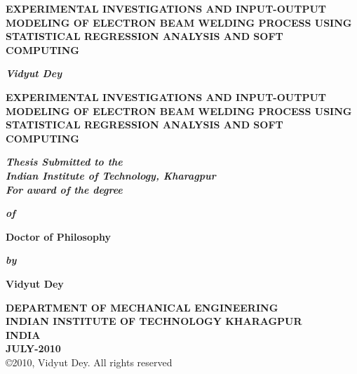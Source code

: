 \begin{center}
{\Large \bf EXPERIMENTAL INVESTIGATIONS AND INPUT-OUTPUT MODELING OF ELECTRON BEAM WELDING PROCESS USING STATISTICAL REGRESSION ANALYSIS AND SOFT COMPUTING} 
\end{center}
\vspace{500pt}
\large
\begin{flushright}
{\bf \em Vidyut Dey}  
\end{flushright}
\newpage
\begin{center}
{\Large \bf EXPERIMENTAL INVESTIGATIONS AND INPUT-OUTPUT MODELING OF ELECTRON BEAM WELDING PROCESS USING STATISTICAL REGRESSION ANALYSIS AND SOFT COMPUTING} 
\end{center}
\onehalfspacing
\vspace{4pt}
\normalsize
\begin{center}
{\bf \em Thesis Submitted to the}  \\
{\bf \em Indian Institute of Technology, Kharagpur} \\
{\bf \em For award of the degree} \\ 
\end{center}
\onehalfspacing
\vspace{1pt}
\normalsize
\begin{center}
{\bf \em of} \\ 
\end{center}
\vspace{1pt}
\Large
\begin{center}
{\textbf{Doctor of Philosophy}}\\
\end{center}
\vspace{1pt}
\normalsize
\begin{center}
{\bf \em by}\\
\end{center}
\vspace{1pt}
\Large
\begin{center}
{\textbf{Vidyut Dey}} \\ 
\end{center}
\vspace{1pt}
\begin{center}
{\centering {} \par}
\end{center}
\vspace{1pt}
\large
\begin{center}
{\bf DEPARTMENT OF MECHANICAL ENGINEERING}\\
{\bf INDIAN INSTITUTE OF TECHNOLOGY KHARAGPUR}\\
{\bf INDIA}\\
{\bf  JULY-2010}\\ 
\small{\copyright 2010, Vidyut Dey. All rights reserved}
\end{center}


